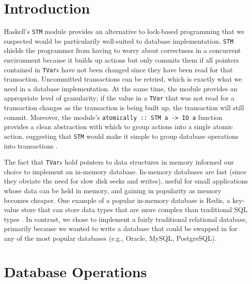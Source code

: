 \documentclass[10pt]{article}
\begin{document}
\vspace{5mm}
\begin{multicols}{2}

\section{Introduction} 
Haskell's \texttt{STM} module provides an alternative to lock-based programming that we suspected would be particularily well-suited to database implementation. \texttt{STM} shields the programmer from having to worry about correctness in a concurrent environment because it builds up actions but only commits them if all pointers contained in \texttt{TVar}s have not been changed since they have been read for that transaction. Uncommitted transactions can be retried, which is exactly what we need in a database implementation. At the same time, the module provides an appropriate level of granularity; if the value in a \texttt{TVar} that was not read for a transaction changes as the transaction is being built up, the transaction will still commit. Moreover, the module's \texttt{atomically :: STM a -> IO a} function provides a clean abstraction with which to group actions into a single atomic action, suggesting that \texttt{STM} would make it simple to group database operations into transactions \cite{harris}. 

The fact that \texttt{TVar}s hold pointers to data structures in memory informed our choice to implement an in-memory database. In-memory databases are fast (since they obviate the need for slow disk seeks and writes), useful for small applications whose data can be held in memory, and gaining in popularity as memory becomes cheaper. One example of a popular in-memory database is Redis, a key-value store that can store data types that are more complex than traditional SQL types \cite{redis}. In contrast, we chose to implement a fairly traditional relational database, primarily because we wanted to write a database that could be swapped in for any of the most popular databases (e.g., Oracle, MySQL, PostgreSQL). 

\section{Database Operations}

\end{multicols}
\end{document}
